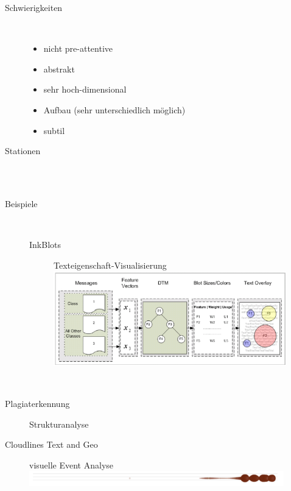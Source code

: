 \begin{description}
	\item[Schwierigkeiten] \ \\\vspace*{-\baselineskip}
		\begin{itemize}
			\item nicht pre-attentive
			\item abstrakt
			\item sehr hoch-dimensional
			\item Aufbau (sehr unterschiedlich möglich)
			\item subtil
		\end{itemize}
	\item[Stationen] \ \\\vspace*{-0.5\baselineskip}\\
	
	\item[Beispiele] \ \\\vspace*{-\baselineskip}
		\begin{description}
			\item[InkBlots] Texteigenschaft-Visualisierung \\
				\includegraphics[width=0.9\textwidth]{Pics/03-02-InkBlots.png}
		\end{description}
\end{description}
\topbreak
\begin{description}
	\item \ \\\vspace*{-\baselineskip}
		\begin{description}
			\item[Plagiaterkennung] Strukturanalyse
			\item[Cloudlines Text and Geo] visuelle Event Analyse\\
			\includegraphics[width=0.9\textwidth]{Pics/03-02-Cloudlines.png}
		\end{description}
\end{description}